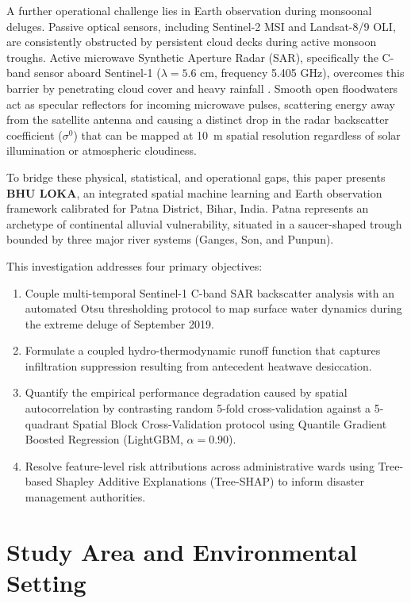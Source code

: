 \documentclass[OA,linenum]{InterPore}
\begin{document}
A further operational challenge lies in Earth observation during monsoonal deluges. Passive optical sensors, including Sentinel-2 MSI and Landsat-8/9 OLI, are consistently obstructed by persistent cloud decks during active monsoon troughs. Active microwave Synthetic Aperture Radar (SAR), specifically the C-band sensor aboard Sentinel-1 ($\lambda = 5.6\text{ cm}$, frequency 5.405 GHz), overcomes this barrier by penetrating cloud cover and heavy rainfall \cite{MapAction2024}. Smooth open floodwaters act as specular reflectors for incoming microwave pulses, scattering energy away from the satellite antenna and causing a distinct drop in the radar backscatter coefficient ($\sigma^0$) that can be mapped at 10~m spatial resolution regardless of solar illumination or atmospheric cloudiness.

To bridge these physical, statistical, and operational gaps, this paper presents \textbf{BHU LOKA}, an integrated spatial machine learning and Earth observation framework calibrated for Patna District, Bihar, India. Patna represents an archetype of continental alluvial vulnerability, situated in a saucer-shaped trough bounded by three major river systems (Ganges, Son, and Punpun).

This investigation addresses four primary objectives:
\begin{enumerate}
    \item Couple multi-temporal Sentinel-1 C-band SAR backscatter analysis with an automated Otsu thresholding protocol to map surface water dynamics during the extreme deluge of September 2019.
    \item Formulate a coupled hydro-thermodynamic runoff function that captures infiltration suppression resulting from antecedent heatwave desiccation.
    \item Quantify the empirical performance degradation caused by spatial autocorrelation by contrasting random 5-fold cross-validation against a 5-quadrant Spatial Block Cross-Validation protocol using Quantile Gradient Boosted Regression (LightGBM, $\alpha = 0.90$).
    \item Resolve feature-level risk attributions across administrative wards using Tree-based Shapley Additive Explanations (Tree-SHAP) to inform disaster management authorities.
\end{enumerate}

\section{Study Area and Environmental Setting}
\end{document}
